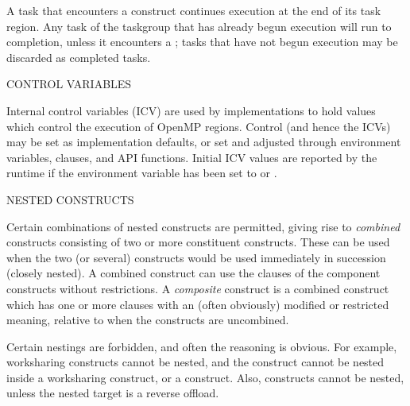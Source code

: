 A task that encounters a  construct continues execution at the end of its
task region. Any task of the taskgroup that has already begun execution will run to completion,
unless it encounters a ; tasks that have not begun execution may be
discarded as completed tasks.

\pagebreak
CONTROL VARIABLES 

Internal control variables (ICV) are used by implementations to hold values which control the execution
of OpenMP regions. Control (and hence the ICVs) may be set as implementation defaults, 
or set and adjusted through environment variables, clauses, and API functions.
Initial ICV values are reported by the runtime
if the  environment variable has been set to  or . 


\bigskip
NESTED CONSTRUCTS

Certain combinations of nested constructs are permitted, giving rise to \emph{combined} constructs
consisting of two or more constituent constructs. These can be used when the two (or several) constructs would be used
immediately in succession (closely nested). A combined construct can use the clauses of the component
constructs without restrictions.
A \emph{composite} construct is a combined construct which has one or more clauses with an (often obviously)
modified or restricted meaning, relative to when the constructs are uncombined.

Certain nestings are forbidden, and often the reasoning is obvious. For example, worksharing constructs cannot be nested, and
the  construct cannot be nested inside a worksharing construct, or a  construct. 
Also,  constructs cannot be nested, unless the nested target is a reverse offload.

